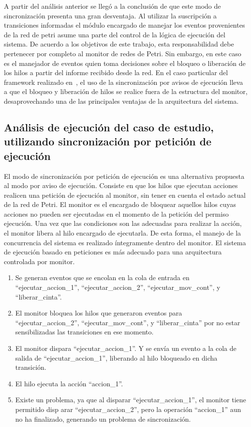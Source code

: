 A partir del análisis anterior se llegó a la conclusión de que este modo de
sincronización presenta una gran desventaja.
Al utilizar la suscripción a transiciones informadas el módulo
encargado de manejar los eventos provenientes de la red de petri asume
una parte del control de la lógica de ejecución del sistema.
De acuerdo a los objetivos de este trabajo, esta responsabilidad debe pertenecer
por completo al monitor de redes de Petri. Sin embargo, en este caso es el
manejador de eventos quien toma decisiones sobre el bloqueo o liberación de los
hilos a partir del informe recibido desde la red. En el caso
particular del framework realizado en~\cite{chimp}, el uso de la sincronización
por avisos de ejecución lleva a que el bloqueo y liberación de hilos se realice
fuera de la estructura del monitor, desaprovechando una de las principales
ventajas de la arquitectura del sistema.
\\

\subsection{Análisis de ejecución del caso de estudio, utilizando
sincronización por petición de ejecución}
\label{sec:sincronizacion_peticion_ejecucion}
 El modo de sincronización por petición de ejecución es una alternativa
 propuesta al modo por aviso de ejecución.
 Consiste en que los hilos que ejecutan acciones realicen una petición de ejecución al
 monitor, sin tener en cuenta el estado actual de la red de Petri.
 El monitor es el encargado de bloquear aquellos hilos cuyas acciones no
 pueden ser ejecutadas en el momento de la petición del permiso ejecución. Una
 vez que las condiciones son las adecuadas para realizar la acción, el monitor
 libera al hilo encargado de ejecutarla.
 De esta forma, el manejo de la concurrencia del sistema es realizado
 íntegramente dentro del monitor. El sistema de ejecución basado en
 peticiones es más adecuado para una arquitectura controlada por monitor. 

\begin{enumerate}
    \item Se generan eventos que se encolan en la cola de entrada en
    ``ejecutar\_accion\_1'', ``ejecutar\_accion\_2'', ``ejecutar\_mov\_cont'', y
    ``liberar\_cinta''.
    \item El monitor bloquea los hilos que generaron eventos para
    ``ejecutar\_accion\_2'', ``ejecutar\_mov\_cont'', y ``liberar\_cinta'' por no
    estar sensibilizadas las transiciones en ese momento.
    \item El monitor dispara “ejecutar\_accion\_1”. Y se envía un evento a la
    cola de salida de “ejecutar\_accion\_1”, liberando al hilo bloqueado en
    dicha transición.
    \item El hilo ejecuta la acción “accion\_1”.
    \item Existe un problema, ya que al disparar “ejecutar\_accion\_1”, el
    monitor tiene permitido disp arar “ejecutar\_accion\_2”, pero la operación
    “accion\_1” aun no ha finalizado, generando un problema de sincronización.
\end{enumerate}

